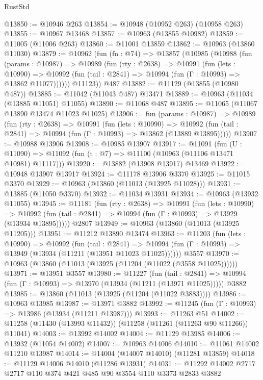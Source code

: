 \begin{lexlean}{RustStd}
\begin{coremodule}
{\begin{coremodule}
{{{{{{{{{{{{{{{{{{{{{{{{{{{{{{{{{@13850 := @10946 @263
@13854 := @10948 (@10952 @263) (@10958 @263)
@13855 := @10967 @13468
@13857 := @10963 (@13855 @10982)
@13859 := @11005 (@11006 @263)
@13860 := @11001 @13859
@13862 := @10963 (@13860 @11030)
@13879 := @10962
    (fun (fn : @74) =>
    @13857
      (@10985
        (@10988
          (fun (params : @10987) =>
          @10989
            (fun (rty : @2638) =>
            @10991
              (fun (lets : @10990) =>
              @10992 (fun (tail : @2841) => @10994 (fun (Γ : @10993) => @13862 @11077))))))
        @11123))
    @487
@13882 := @11129 (@13855 (@10980 @487))
@13885 := @11042 (@11043 @487) @13471
@13889 := @10963 (@11034 (@13885 @11051) @11055)
@13890 := @11068 @487
@13895 := @11065 (@11067 @13890 @13474 @11023 @11025)
@13906 := fun (params : @10987) =>
  @10989
    (fun (rty : @2638) =>
    @10991
      (fun (lets : @10990) =>
      @10992 (fun (tail : @2841) => @10994 (fun (Γ : @10993) => @13862 (@13889 @13895)))))
@13907 := @10988 @13906
@13908 := @10985 @13907
@13917 := @11091
    (fun (U : @11090) => @11092 (fun (t : @7) => @11100 (@10963 (@11106 @13471 @10981) @11117)))
@13920 := @13882 (@13908 @13917) @13469
@13922 := @10948 @13907 @13917
@13924 := @11178 @13906 @3370
@13925 := @11015 @3370
@13929 := @10963 (@13860 (@11013 (@13925 @11028)))
@13931 := @13885 (@11050 @3370)
@13932 := @11034 @13931
@13934 := @10963 (@13932 @11055)
@13945 := @11181
    (fun (rty : @2638) =>
    @10991
      (fun (lets : @10990) =>
      @10992 (fun (tail : @2841) => @10994 (fun (Γ : @10993) => @13929 (@13934 @13895)))))
    @2807
@13949 := @10963 (@13860 (@11013 (@13925 @11205)))
@13951 := @11212 @13890 @13474
@13963 := @11203
    (fun (lets : @10990) =>
    @10992
      (fun (tail : @2841) =>
      @10994 (fun (Γ : @10993) => @13949 (@13934 (@11211 (@13951 @11023 @11025))))))
    @3557
@13970 := @10963 (@13860 (@11013 (@13925 (@11204 (@11022 (@3558 @11025))))))
@13971 := @13951 @3557
@13980 := @11227
    (fun (tail : @2841) => @10994 (fun (Γ : @10993) => @13970 (@13934 (@11211 (@13971 @11025)))))
    @3882
@13985 := @13860 (@11013 (@13925 (@11204 (@11022 @3883))))
@13986 := @10963 @13985
@13987 := @13971 @3882
@13992 := @11245 (fun (Γ : @10993) => @13986 (@13934 (@11211 @13987)))
@13993 := @11263 @51
@14002 := @11258 (@11430 (@13993 @11432)) (@11258 (@11261 (@11263 @90 @11266)) @11041)
@14003 := @13992 @14002
@14004 := @11129 @13985
@14006 := @13932 (@11054 @14002)
@14007 := @10963 @14006
@14010 := @11061 @14002 @11210 @13987
@14014 := @14004 (@14007 @14010) (@11281 @13859)
@14018 := @11129 @14006 @14010 (@11286 @13931)
@14031 := @11292 @14002 @2717 @2717 @110 @374 @421 @485 @90 @3554 @110 @3373 @2833 @3882
}}}}}}}}}}}}}}}}}}}}}}}}}}}}}}}}}
\end{coremodule}}
\end{coremodule}
\end{lexlean}
